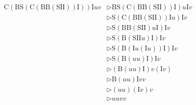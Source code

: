 \documentclass[a4paper, 12pt]{report}
\begin{document}
    \begin{equation*}
        \begin{split}
            \mathrm C(\mathrm B\mathrm S(\mathrm C(\mathrm B \mathrm B(\mathrm S\mathrm I\mathrm I))\mathrm I)) \mathrm I uv &\triangleright \mathrm B\mathrm S(\mathrm C(\mathrm B \mathrm B(\mathrm S\mathrm I\mathrm I))\mathrm I) u \mathrm I v \\
                                                                                                                             &\triangleright \mathrm S(\mathrm C(\mathrm B \mathrm B(\mathrm S\mathrm I\mathrm I))\mathrm I u) \mathrm I v \\
                                                                                                                             &\triangleright \mathrm S(\mathrm B \mathrm B(\mathrm S\mathrm I\mathrm I) u \mathrm I) \mathrm I v \\
                                                                                                                             &\triangleright \mathrm S (\mathrm B (\mathrm S \mathrm I \mathrm I u) \mathrm I) \mathrm I v \\
                                                                                                                             &\triangleright \mathrm S (\mathrm B (\mathrm I u (\mathrm I u))\mathrm I) \mathrm I v \\
                                                                                                                             &\triangleright \mathrm S (\mathrm B ( u u)\mathrm I) \mathrm I v \\
                                                                                                                             &\triangleright (\mathrm B (uu)\mathrm I) v(\mathrm I v) \\
                                                                                                                             &\triangleright \mathrm B (uu)\mathrm I vv \\
                                                                                                                             &\triangleright (uu)(\mathrm Iv )v \\
                                                                                                                             &\triangleright uuvv
        \end{split}
    \end{equation*}
\end{document}

